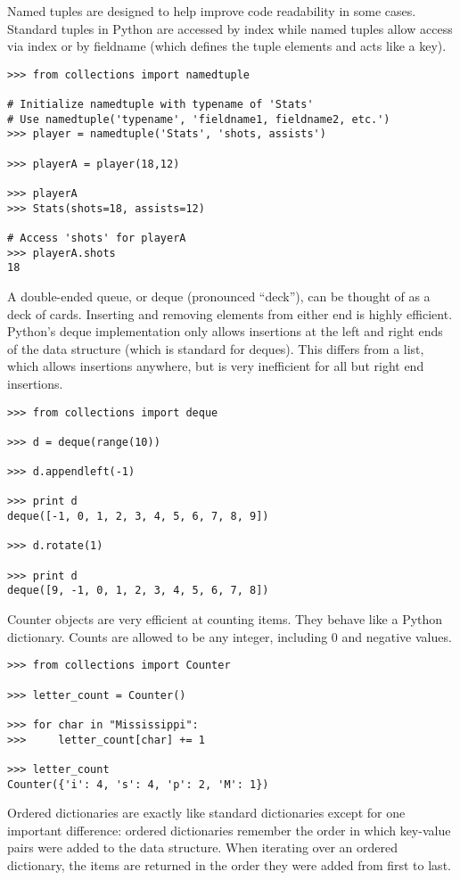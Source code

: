 Named tuples are designed to help improve code readability in some cases.
Standard tuples in Python are accessed by index while named tuples allow access via index or by fieldname (which defines the tuple elements and acts like a key).
\begin{lstlisting}
>>> from collections import namedtuple

# Initialize namedtuple with typename of 'Stats'
# Use namedtuple('typename', 'fieldname1, fieldname2, etc.')
>>> player = namedtuple('Stats', 'shots, assists')

>>> playerA = player(18,12)

>>> playerA
>>> Stats(shots=18, assists=12)

# Access 'shots' for playerA
>>> playerA.shots
18
\end{lstlisting}

\label{deques}
A double-ended queue, or deque (pronounced ``deck''), can be thought of as a deck of cards.
Inserting and removing elements from either end is highly efficient.
Python's deque implementation only allows insertions at the left and right ends of the data structure (which is standard for deques).
This differs from a list, which allows insertions anywhere, but is very inefficient for all but right end insertions.

\begin{lstlisting}
>>> from collections import deque

>>> d = deque(range(10))

>>> d.appendleft(-1)

>>> print d
deque([-1, 0, 1, 2, 3, 4, 5, 6, 7, 8, 9])

>>> d.rotate(1)

>>> print d
deque([9, -1, 0, 1, 2, 3, 4, 5, 6, 7, 8])
\end{lstlisting}

Counter objects are very efficient at counting items.  They behave like a Python dictionary.  Counts are allowed to be any integer, including 0 and negative values.

\begin{lstlisting}
>>> from collections import Counter

>>> letter_count = Counter()

>>> for char in "Mississippi":
>>>     letter_count[char] += 1   

>>> letter_count
Counter({'i': 4, 's': 4, 'p': 2, 'M': 1})
\end{lstlisting}

Ordered dictionaries are exactly like standard dictionaries except for one important difference:
ordered dictionaries remember the order in which key-value pairs were added to the data structure.
When iterating over an ordered dictionary, the items are returned in the order they were added from first to last.

